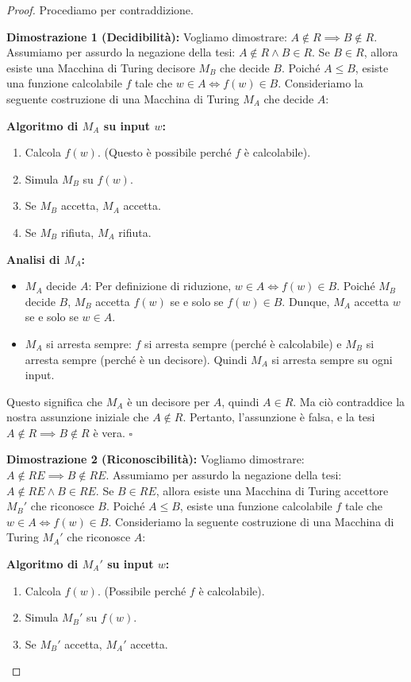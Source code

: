 \documentclass[a4paper]{article}
\newcommand{\blankS}{\ensuremath{\square}}
\begin{document}
\begin{proof}
Procediamo per contraddizione.

\textbf{Dimostrazione 1 (Decidibilità):}
Vogliamo dimostrare: $A \notin R \implies B \notin R$.
Assumiamo per assurdo la negazione della tesi: $A \notin R \land B \in R$.
Se $B \in R$, allora esiste una Macchina di Turing decisore $M_B$ che decide $B$.
Poiché $A \le B$, esiste una funzione calcolabile $f$ tale che $w \in A \iff f(w) \in B$.
Consideriamo la seguente costruzione di una Macchina di Turing $M_A$ che decide $A$:

\textbf{Algoritmo di $M_A$ su input $w$:}
\begin{enumerate}
    \item Calcola $f(w)$. (Questo è possibile perché $f$ è calcolabile).
    \item Simula $M_B$ su $f(w)$.
    \item Se $M_B$ accetta, $M_A$ accetta.
    \item Se $M_B$ rifiuta, $M_A$ rifiuta.
\end{enumerate}

\textbf{Analisi di $M_A$:}
\begin{itemize}
    \item $M_A$ decide $A$: Per definizione di riduzione, $w \in A \iff f(w) \in B$. Poiché $M_B$ decide $B$, $M_B$ accetta $f(w)$ se e solo se $f(w) \in B$. Dunque, $M_A$ accetta $w$ se e solo se $w \in A$.
    \item $M_A$ si arresta sempre: $f$ si arresta sempre (perché è calcolabile) e $M_B$ si arresta sempre (perché è un decisore). Quindi $M_A$ si arresta sempre su ogni input.
\end{itemize}
Questo significa che $M_A$ è un decisore per $A$, quindi $A \in R$.
Ma ciò contraddice la nostra assunzione iniziale che $A \notin R$.
Pertanto, l'assunzione è falsa, e la tesi $A \notin R \implies B \notin R$ è vera.
$\blankS$

\textbf{Dimostrazione 2 (Riconoscibilità):}
Vogliamo dimostrare: $A \notin RE \implies B \notin RE$.
Assumiamo per assurdo la negazione della tesi: $A \notin RE \land B \in RE$.
Se $B \in RE$, allora esiste una Macchina di Turing accettore $M_B'$ che riconosce $B$.
Poiché $A \le B$, esiste una funzione calcolabile $f$ tale che $w \in A \iff f(w) \in B$.
Consideriamo la seguente costruzione di una Macchina di Turing $M_A'$ che riconosce $A$:

\textbf{Algoritmo di $M_A'$ su input $w$:}
\begin{enumerate}
    \item Calcola $f(w)$. (Possibile perché $f$ è calcolabile).
    \item Simula $M_B'$ su $f(w)$.
    \item Se $M_B'$ accetta, $M_A'$ accetta.
\end{enumerate}


\end{proof}
\end{document}
